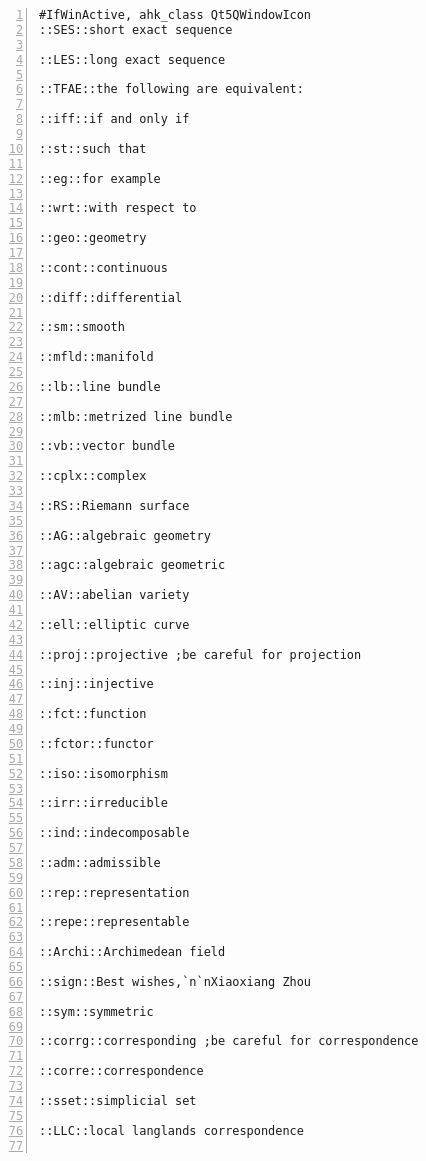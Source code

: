 \documentclass[11pt]{amsart}
\begin{document}
\begin{lstlisting}[numbers=left,numberstyle=\tiny,numbersep=10pt]
#IfWinActive, ahk_class Qt5QWindowIcon
::SES::short exact sequence

::LES::long exact sequence

::TFAE::the following are equivalent:

::iff::if and only if

::st::such that 

::eg::for example

::wrt::with respect to

::geo::geometry

::cont::continuous

::diff::differential

::sm::smooth

::mfld::manifold

::lb::line bundle

::mlb::metrized line bundle

::vb::vector bundle

::cplx::complex

::RS::Riemann surface

::AG::algebraic geometry

::agc::algebraic geometric

::AV::abelian variety

::ell::elliptic curve

::proj::projective ;be careful for projection

::inj::injective

::fct::function

::fctor::functor

::iso::isomorphism

::irr::irreducible

::ind::indecomposable

::adm::admissible

::rep::representation

::repe::representable 

::Archi::Archimedean field

::sign::Best wishes,`n`nXiaoxiang Zhou

::sym::symmetric

::corrg::corresponding ;be careful for correspondence

::corre::correspondence

::sset::simplicial set

::LLC::local langlands correspondence


\end{lstlisting}
\end{document}
